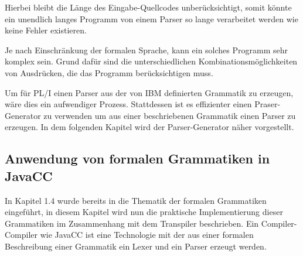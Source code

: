 Hierbei bleibt die Länge des Eingabe-Quellcodes unberücksichtigt, somit könnte ein unendlich langes Programm von einem Parser so lange
verarbeitet werden wie keine Fehler existieren.

Je nach Einschränkung der formalen Sprache, kann ein solches Programm sehr komplex sein.
Grund dafür sind die unterschiedlichen Kombinationsmöglichkeiten von Ausdrücken, die das Programm
berücksichtigen muss.


Um für PL/I einen Parser aus der von IBM definierten Grammatik zu erzeugen, wäre
dies ein aufwendiger Prozess. Stattdessen ist es effizienter einen Praser-Generator
zu verwenden um aus einer beschriebenen Grammatik einen Parser zu erzeugen.
In dem folgenden Kapitel wird der Parser-Generator näher vorgestellt.


     
\pagebreak
\subsection{Anwendung von formalen Grammatiken in JavaCC}

In Kapitel 1.4 wurde bereits in die Thematik der formalen Grammatiken eingeführt, in diesem Kapitel wird nun die praktische Implementierung dieser Grammatiken im Zusammenhang mit dem Transpiler beschrieben.
Ein Compiler-Compiler wie JavaCC ist eine Technologie mit der aus einer formalen Beschreibung einer Grammatik ein Lexer und ein Parser erzeugt werden. 

